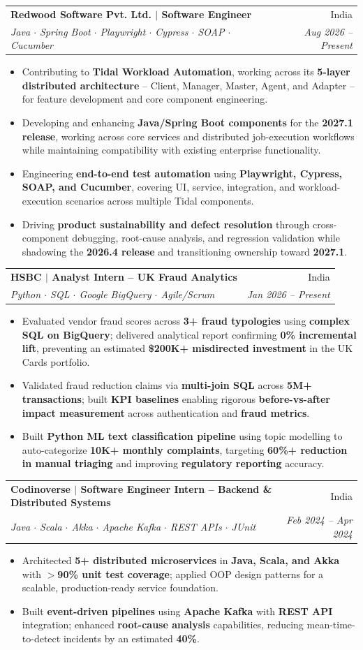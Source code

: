 \documentclass[letterpaper,10.5pt]{article}
\makeatletter
\newcommand{\resumeItem}[1]{\item\small{#1\vspace{-2.5pt}}}
\newcommand{\resumeSubheading}[4]{
  \vspace{-2pt}\item
  \begin{tabular*}{0.97\textwidth}[t]{l@{\extracolsep{\fill}}r}
    \textbf{#1} & \small #2 \\
    \textit{\small #3} & \textit{\small #4} \\
  \end{tabular*}\vspace{-7pt}
}
\newcommand{\resumeItemListStart}{\begin{itemize}[leftmargin=0.2in]\vspace{-2pt}}
\newcommand{\resumeItemListEnd}{\end{itemize}\vspace{-6pt}}
\makeatother
\begin{document}
  \resumeSubheading
    {Redwood Software Pvt. Ltd. \textnormal{$|$ Software Engineer}}{India}
    {Java $\cdot$ Spring Boot $\cdot$ Playwright $\cdot$ Cypress $\cdot$ SOAP $\cdot$ Cucumber}{Aug 2026 -- Present}
  \resumeItemListStart
    \resumeItem{Contributing to \textbf{Tidal Workload Automation}, working across its \textbf{5-layer distributed architecture} -- Client, Manager, Master, Agent, and Adapter -- for feature development and core component engineering.}
    \resumeItem{Developing and enhancing \textbf{Java/Spring Boot components} for the \textbf{2027.1 release}, working across core services and distributed job-execution workflows while maintaining compatibility with existing enterprise functionality.}
    \resumeItem{Engineering \textbf{end-to-end test automation} using \textbf{Playwright, Cypress, SOAP, and Cucumber}, covering UI, service, integration, and workload-execution scenarios across multiple Tidal components.}
    \resumeItem{Driving \textbf{product sustainability and defect resolution} through cross-component debugging, root-cause analysis, and regression validation while shadowing the \textbf{2026.4 release} and transitioning ownership toward \textbf{2027.1}.}
  \resumeItemListEnd

  \resumeSubheading
    {HSBC \textnormal{$|$ Analyst Intern -- UK Fraud Analytics}}{India}
    {Python $\cdot$ SQL $\cdot$ Google BigQuery $\cdot$ Agile/Scrum}{Jan 2026 -- Present}
  \resumeItemListStart
    \resumeItem{Evaluated vendor fraud scores across \textbf{3+ fraud typologies} using \textbf{complex SQL on BigQuery}; delivered analytical report confirming \textbf{0\% incremental lift}, preventing an estimated \textbf{\$200K+ misdirected investment} in the UK Cards portfolio.}
    \resumeItem{Validated fraud reduction claims via \textbf{multi-join SQL} across \textbf{5M+ transactions}; built \textbf{KPI baselines} enabling rigorous \textbf{before-vs-after impact measurement} across authentication and \textbf{fraud metrics}.}
    \resumeItem{Built \textbf{Python ML text classification pipeline} using topic modelling to auto-categorize \textbf{10K+ monthly complaints}, targeting \textbf{60\%+ reduction in manual triaging} and improving \textbf{regulatory reporting} accuracy.}
  \resumeItemListEnd

  \resumeSubheading
    {Codinoverse \textnormal{$|$ Software Engineer Intern -- Backend \& Distributed Systems}}{India}
    {Java $\cdot$ Scala $\cdot$ Akka $\cdot$ Apache Kafka $\cdot$ REST APIs $\cdot$ JUnit}{Feb 2024 -- Apr 2024}
  \resumeItemListStart
    \resumeItem{Architected \textbf{5+ distributed microservices} in \textbf{Java, Scala, and Akka} with \textbf{$>$90\% unit test coverage}; applied OOP design patterns for a scalable, production-ready service foundation.}
    \resumeItem{Built \textbf{event-driven pipelines} using \textbf{Apache Kafka} with \textbf{REST API} integration; enhanced \textbf{root-cause analysis} capabilities, reducing mean-time-to-detect incidents by an estimated \textbf{40\%}.}
  \resumeItemListEnd
\end{document}
